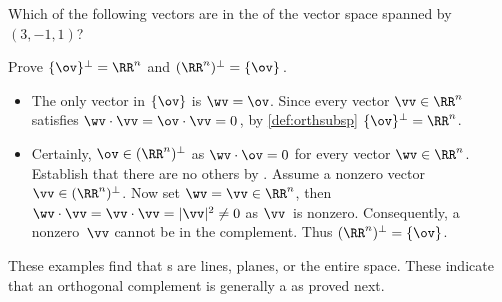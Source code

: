 \begin{activity}
Which of the following vectors are in the  of the vector space spanned by~\((3,-1,1)\)?
\end{activity}



\begin{example} 
Prove \(\{\ov\}^\perp=\RR^n\) and \((\RR^n)^\perp=\{\ov\}\)\,.
\begin{solution} 
\begin{itemize}
\item The only vector in \(\{\ov\}\) is \(\wv=\ov\).
Since every vector \(\vv\in\RR^n\) satisfies \(\wv\cdot\vv=\ov\cdot\vv=0\)\,, by \cref{def:orthsubsp} \(\{\ov\}^\perp=\RR^n\).

\item Certainly, \(\ov\in(\RR^n)^\perp\) as \(\wv\cdot\ov=0\) for every vector \(\wv\in\RR^n\).
Establish that there are no others by .
Assume a nonzero vector \(\vv\in(\RR^n)^\perp\).
Now set \(\wv=\vv\in\RR^n\), then \(\wv\cdot\vv=\vv\cdot\vv=|\vv|^2\neq0\) as \(\vv\)~is nonzero.
Consequently, a nonzero~\(\vv\) cannot be in the complement.
Thus \((\RR^n)^\perp=\{\ov\}\).
\end{itemize}
\end{solution}
\end{example}




%
%
%

These examples find that s are lines, planes, or the entire space.  
These indicate that an orthogonal complement is generally a  as proved next.

